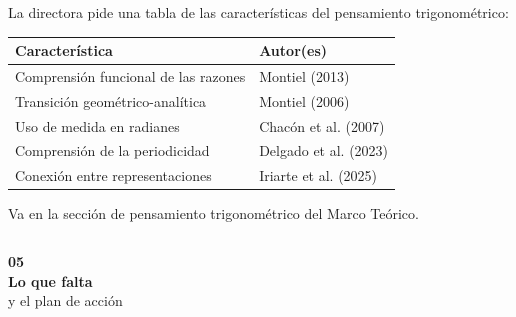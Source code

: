 \documentclass[11pt, aspectratio=169, spanish]{beamer}
\begin{document}
\begin{frame}[plain]
\begin{columns}[T]

\begin{tcolorbox}[colback=RojoAlerta!5, colframe=RojoAlerta!50, arc=2mm,
  title={\footnotesize\textbf{\faTable\quad Tabla requerida — C28}}]
{\scriptsize La directora pide una tabla de las características del pensamiento trigonométrico:}

{\tiny
\begin{tabular}{p{2.7cm}p{1.8cm}}
\toprule
\textbf{Característica} & \textbf{Autor(es)} \\
\midrule
Comprensión funcional de las razones & Montiel (2013) \\[1pt]
Transición geométrico-analítica & Montiel (2006) \\[1pt]
Uso de medida en radianes & Chacón et al. (2007) \\[1pt]
Comprensión de la periodicidad & Delgado et al. (2023) \\[1pt]
Conexión entre representaciones & Iriarte et al. (2025) \\
\bottomrule
\end{tabular}}

{\tiny\textcolor{NaranjaPend}{\faArrowRight\; Va en la sección de pensamiento trigonométrico del Marco Teórico.}}
\end{tcolorbox}

\end{columns}
\end{frame}

\begin{frame}[plain]
\vspace*{1.0cm}
\begin{center}
{\fontsize{40}{48}\selectfont\textcolor{VerdeUNAL!40}{\textbf{05}}}\\[-0.1cm]
{\Large\textbf{Lo que falta}}\\[0.05cm]
{\normalsize\textcolor{GrisClaro!80!black}{y el plan de acción}}
\end{center}
\end{frame}
\end{document}
